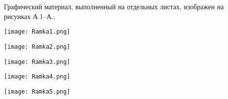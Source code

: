 
Графический материал, выполненный на отдельных листах,
изображен на рисунках А.1--А..
\setcounter{числоПлакатов}{0}

\renewcommand{\thefigure}{А.\arabic{figure}} %

\begin{landscape}

\begin{плакат}
    \texttt{[image: Ramka1.png]}
    \label{pl1:image}      
\end{плакат}

\begin{плакат}
    \texttt{[image: Ramka2.png]}
    \label{pl2:image}      
\end{плакат}

\begin{плакат}
    \texttt{[image: Ramka3.png]}
    \label{pl3:image}      
\end{плакат}

\begin{плакат}
    \texttt{[image: Ramka4.png]}
    \label{pl4:image}      
\end{плакат}

\begin{плакат}
	\texttt{[image: Ramka5.png]}
	\label{pl5:image}      
\end{плакат}

\end{landscape}
